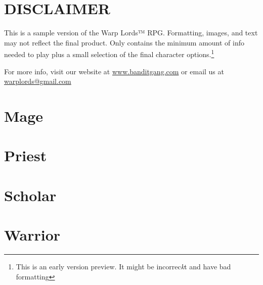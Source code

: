 \documentclass[letterpaper,10pt,twoside]{book}
\begin{document}
\chapter*{DISCLAIMER}

This is a sample version of the Warp Lords™ RPG. Formatting, images, and text may not reflect the final product. Only contains the minimum amount of info needed to play plus a small selection of the final character options.\footnote{This is an early version preview. It might be incorrec{\emph k}t and have bad format\hspace{-0.5ex}ting}

For more info, visit our website at \href{www.banditgang.com}{www.banditgang.com} or email us at \href{mailto:warplords@gmail.com}{warplords@gmail.com}


%


%
%
%
%
%
%

%
%

%


%
%
\chapter{Mage}




%
%
%
%
%
%
%
\chapter{Priest}

%
%
%
%

%

%
%
%
\chapter{Scholar}

%
%
%

%
%

%
%
%
\chapter{Warrior}


%

%
%
%
%
%
%


\end{document}
